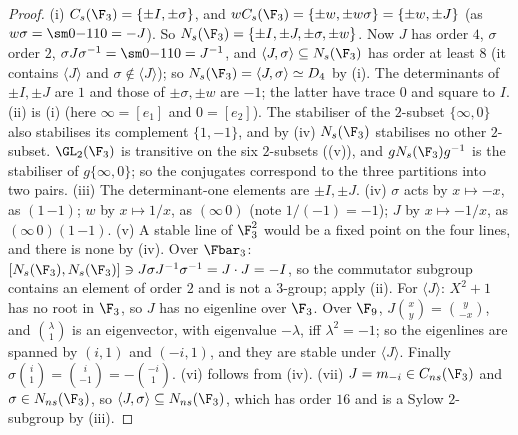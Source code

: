 \begin{proof}
(i) $C_s(\F_3)=\{\pm I,\pm\sigma\}$, and $wC_s(\F_3)=\{\pm w,\pm w\sigma\}=\{\pm w,\pm J\}$ (as $w\sigma=\sm0{-1}10=-J$). So $N_s(\F_3)=\{\pm I,\pm J,\pm\sigma,\pm w\}$. Now $J$ has order $4$,
$\sigma$ order $2$, $\sigma J\sigma^{-1}=\sm0{-1}10=J^{-1}$, and $\langle J,\sigma\rangle\subseteq N_s(\F_3)$ has order at least $8$ (it contains $\langle J\rangle$ and $\sigma\notin\langle J\rangle$);
so $N_s(\F_3)=\langle J,\sigma\rangle\simeq D_4$ by (i). The determinants of $\pm I,\pm J$ are $1$ and those of $\pm\sigma,\pm w$ are $-1$; the
latter have trace $0$ and square to $I$. (ii) is (i) (here $\infty=[e_1]$ and $0=[e_2]$). The stabiliser of the $2$-subset $\{\infty,0\}$ also
stabilises its complement $\{1,-1\}$, and by (iv) $N_s(\F_3)$ stabilises no other $2$-subset. $\GL_2(\F_3)$ is transitive on the six $2$-subsets
((v)), and $gN_s(\F_3)g^{-1}$ is the stabiliser of $g\{\infty,0\}$; so the conjugates correspond to the three partitions into two pairs.
(iii) The determinant-one elements are $\pm I,\pm J$. (iv) $\sigma$ acts by $x\mapsto-x$, as $(1\,{-1})$; $w$ by $x\mapsto1/x$, as $(\infty\,0)$ (note $1/(-1)=-1$); $J$ by
$x\mapsto-1/x$, as $(\infty\,0)(1\,{-1})$. (v) A stable line of $\F_3^2$ would be a fixed point on the four lines, and there is none by (iv). Over $\Fbar_3$:
$[N_s(\F_3),N_s(\F_3)]\ni J\sigma J^{-1}\sigma^{-1}=J\cdot J=-I$, so the commutator subgroup contains an element of order $2$ and is not a $3$-group; apply
(ii). For $\langle J\rangle$: $X^2+1$ has no root in $\F_3$, so $J$ has no eigenline over $\F_3$. Over $\F_9$, $J\binom xy=\binom y{-x}$, and
$\binom{\lambda}1$ is an eigenvector, with eigenvalue $-\lambda$, iff $\lambda^2=-1$; so the eigenlines are spanned by $(i,1)$ and $(-i,1)$, and they are stable under $\langle J\rangle$.
Finally $\sigma\binom i1=\binom i{-1}=-\binom{-i}1$. (vi) follows from (iv). (vii) $J=m_{-i}\in C_{ns}(\F_3)$ and $\sigma\in N_{ns}(\F_3)$, so $\langle J,\sigma\rangle\subseteq N_{ns}(\F_3)$, which has
order $16$ and is a Sylow $2$-subgroup by (iii).
\end{proof}

